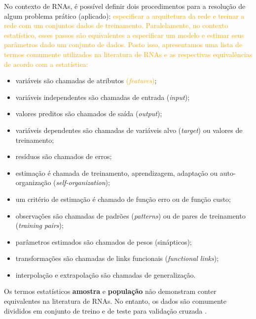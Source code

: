 \documentclass{automatextcc}
\newcommand{\nico}[1]{\textcolor{orange}{#1}}
\newcommand{\pumi}[1]{\textcolor{red}{#1}}
\begin{document}
No contexto de RNAs, é possível definir dois procedimentos para a resolução de algum problema prático (aplicado): \nico{especificar a arquitetura da rede e treinar a rede com um conjuntos dados de treinamento. Paralelamente, no contexto estatístico, esses passos são equivalentes a especificar um modelo e estimar seus parâmetros dado um conjunto de dados. Posto isso, apresentamos uma lista de termos comumente utilizados na literatura de RNAs e as respectivas equivalências de acordo com a estatística:}
\begin{itemize}
    \item variáveis são chamadas de atributos \nico{(\textit{features})};
    \item variáveis independentes são chamadas de entrada (\textit{input});
    \item valores preditos são chamados de saída (\textit{output});
    \item variáveis dependentes são chamadas de variáveis alvo (\textit{target}) ou valores de treinamento;
    \item resíduos são chamados de erros;
    \item estimação é chamada de treinamento, aprendizagem, adaptação ou auto-organização (\textit{self-organization});
    \item um critério de estimação é chamado de função erro ou de função custo;
    \item observações são chamadas de padrões (\textit{patterns}) ou de pares de treinamento (\textit{training pairs});
    \item parâmetros estimados são chamados de pesos (sinápticos);
    \item transformações são chamadas de links funcionais (\textit{functional links});
    \item interpolação e extrapolação são chamadas de generalização.
\end{itemize}
Os termos estatísticos \textbf{amostra} e \textbf{população} não demonstram conter equivalentes na literatura de RNAs. No entanto, os dados são comumente divididos em conjunto de treino e de teste para validação cruzada \citep{cheng1994}.
\end{document}
